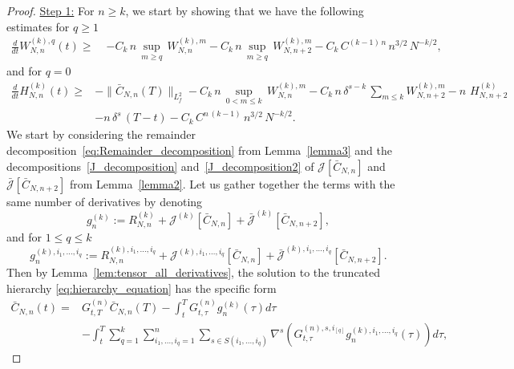 \documentclass[pdflatex,sn-mathphys-num]{sn-jnl}
\theoremstyle{thmstyleone}%
\theoremstyle{thmstyletwo}%
\theoremstyle{thmstylethree}%
\begin{document}
\begin{proof}
\noindent \underline{Step 1:} For $n \geq k$, we start by showing that we have the following estimates for $q\geq 1$ 
\begin{equation}
\label{hierarchy_bound_2}
\begin{aligned}
\frac{d}{dt} W^{(k),q}_{N,n}(t)
\geq\;&
-C_k\, n\,\sup_{m\geq q}\,W^{(k),m}_{N,n}-C_k\, n\,\sup_{m\geq q}\,W^{(k),m}_{N,n+2}-C_k\,C^{(k-1)\,n}\,n^{3/2}\, {N^{-k/2}},
\end{aligned}
\end{equation}
and for $q=0$
\begin{equation} \label{hierarchy_bound_3}
\begin{aligned}
\frac{d}{dt} H^{(k)}_{N,n}(t)\geq &-\|\bar{C}_{N,n}(T)\|_{L^2_f} -C_k\,n\,\sup_{0<m\leq k}\,W^{(k),m}_{N,n}-C_k\,n\,\delta^{s-k}\,\sum_{m\leq k} W^{(k),m}_{N,n+2}-n\,\,H^{(k)}_{N,n+2}\\
&-n\,\delta^s\,(T-t)-C_k\,C^{n\,(k-1)}\,{n^{3/2}}\,{N^{-k/2}}.
\end{aligned}
\end{equation}
%
We start by considering the remainder decomposition~\eqref{eq:Remainder_decomposition} from Lemma~\ref{lemma3} and the decompositions~\eqref{J_decomposition} and~\eqref{J_decomposition2} of \(\mathcal{J}[\bar C_{N,n}]\) and \(\bar{\mathcal{J}}[\bar C_{N,n+2}]\) from Lemma~\ref{lemma2}. Let us gather together the terms with the same number of derivatives by denoting 
\begin{equation} \label{g_n_decomp_k}
g_n^{(k)} :=
R^{(k)}_{N,n}
+ \mathcal{J}^{(k)}[\bar{C}_{N,n}]
+ \bar{\mathcal{J}}^{(k)}[\bar{C}_{N,n+2}] ,
\end{equation}
and for $1 \le q \le k$
\begin{equation}
g_n^{(k),i_1,\dots,i_q} \label{g_n_decomp}
:=
R^{(k),i_1,\dots,i_q}_{N,n}
+\mathcal{J}^{(k),i_1,\dots,i_q}[\bar{C}_{N,n}]
+\bar{\mathcal{J}}^{(k),i_1,\dots,i_q}[\bar{C}_{N,n+2}] .
\end{equation}
Then by Lemma~\ref{lem:tensor_all_derivatives}, the solution to the truncated hierarchy \eqref{eq:hierarchy_equation} has the specific form
\[
\begin{split}
    \bar{C}_{N,n}(t) = &G_{t,T}^{(n)} \bar{C}_{N,n}(T) - \int_t^T G_{t,\tau}^{(n)} g_n^{(k)}(\tau) d\tau\\
    &- \int_t^T \sum_{q=1}^k \sum_{i_1,...,i_q=1}^n \sum_{s \in S(i_1,...,i_q)} \nabla^s \left( G_{t,\tau}^{(n),s,i_{[q]}} g_n^{(k),i_1,...,i_q} (\tau)\right) d\tau,

\end{split}\]
\end{proof}
\end{document}
